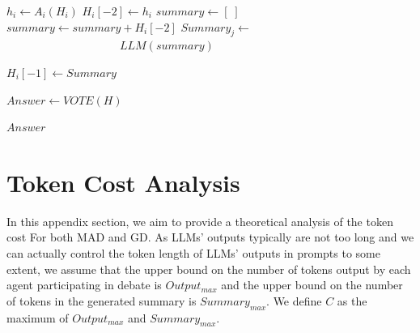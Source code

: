 \begin{breakablealgorithm}
\begin{algorithmic}[1]
                        \State $h_i \gets A_i(H_i)$  
                        \State $H_i[-2] \gets h_i$   
                        \EndIf
                    \EndFor
                \EndFor
                    \State $summary \gets [\;]$
                        \State $summary \gets summary + H_i[-2]$             
                    \EndFor
                    \State $Summary_j \gets$
                    \Statex $\qquad \qquad \qquad \qquad \qquad LLM(summary)$ 
                    
                \EndIf 
            \EndFor
                \State $H_i[-1] \gets Summary $
            \EndFor
                
            
        \EndFor
        \State $Answer \gets VOTE(H)$
        
    \State \Return $Answer$
    \end{algorithmic}
\end{breakablealgorithm}

\section{Token Cost Analysis} \label{appendix:token-cost-analysis}
In this appendix section, we aim to provide a theoretical analysis of the token cost For both MAD and GD. As LLMs' outputs typically are not too long and we can actually control the token length of LLMs' outputs in prompts to some extent, we assume that the upper bound on the number of tokens output by each agent participating in debate is $Output_{max}$ and the upper bound on the number of tokens in the generated summary is $Summary_{max}$. We define $C$ as the maximum of $Output_{max}$ and $Summary_{max}$.
